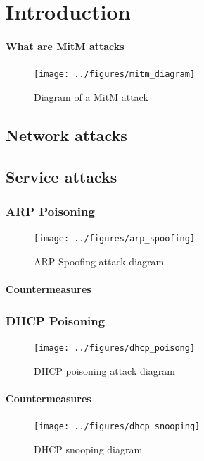 \documentclass{article}
\begin{document}
\def\snode#1#2#3{%
  \node[long,right=of #1, label=center:#3] (#2) {}}

\def\dnode#1#2#3{%
  \node[double,right=of #1, label=center:#3] (#2) {}}



\section{Introduction}
\paragraph{What are \ac{MitM} attacks}
\begin{figure}[h]
\center
\texttt{[image: ../figures/mitm\_diagram]}
\caption{Diagram of a MitM attack}
\end{figure}
\subsection{Network attacks}
\subsection{Service attacks}
\subsubsection{ARP Poisoning}
\begin{figure}[h]
  \center
  \texttt{[image: ../figures/arp\_spoofing]}
  \caption{ARP Spoofing attack diagram}
\end{figure}
\paragraph{Countermeasures}
\subsubsection{DHCP Poisoning}
\begin{figure}[h]
\center
\texttt{[image: ../figures/dhcp\_poisong]}
\caption{DHCP poisoning attack diagram}
\end{figure}

\paragraph{Countermeasures}
\begin{figure}[h]
\center
\texttt{[image: ../figures/dhcp\_snooping]}
\caption{DHCP snooping diagram}
\end{figure}
\end{document}
